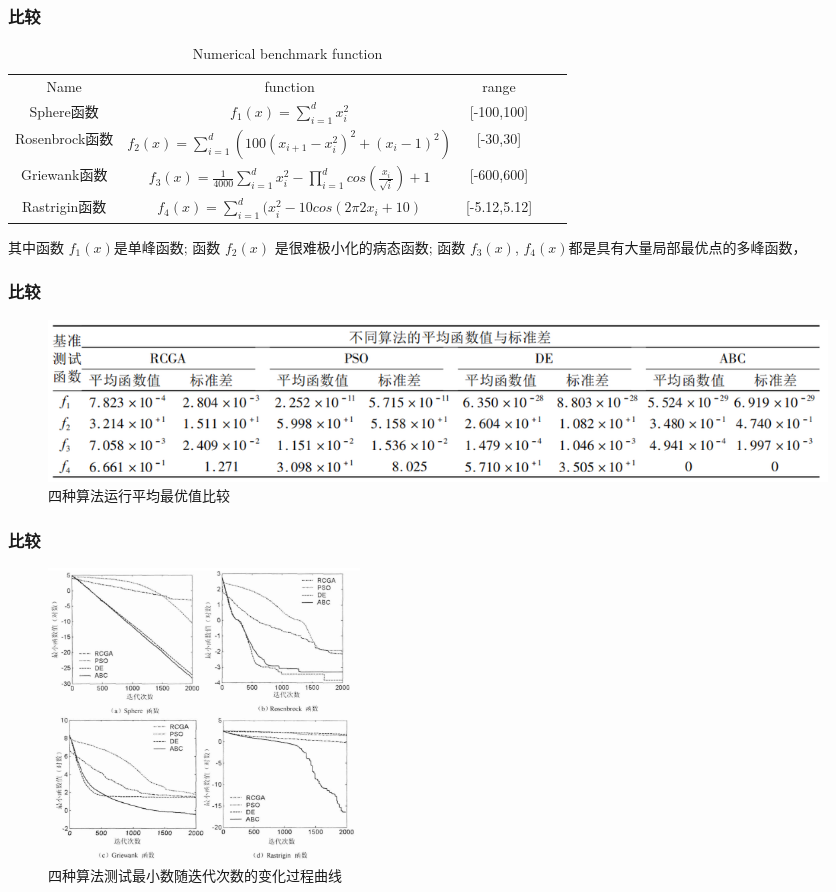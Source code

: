 \begin{frame}
	\frametitle{比较}
	\begin{table}[!htbp]
		\centering
		\caption{Numerical benchmark function}
		\label{my-label}
		\begin{tabular}{|c|c|c|cc}
		\cline{1-2}
		Name     		& function  														& range 		&  &  \\ \cline{1-3}
		Sphere函数 		& $f_{1}(x)= \sum_{i=1}^d x_{i}^2 $     							& [-100,100]	&  &\\ \cline{1-3}
		Rosenbrock函数	& $f_{2}(x)= \sum_{i=1}^d (100(x_{i+1}-x_{i}^2)^2 + (x_{i} - 1)^2 ) $ 	& [-30,30] 		&  &  \\ \cline{1-3}
		Griewank函数    	& $f_{3}(x)= \frac{1}{4000} \sum_{i=1}^d x_{i}^2 -  \prod_{i=1}^d cos(\frac{x_{i}}{\sqrt{i}}) + 1 $   	& [-600,600]	&  &  \\ \cline{1-3}
		Rastrigin函数   	& $f_{4}(x)=\sum_{i=1}^d (x_{i}^2 - 10cos(2   \pi 2 x_{i} + 10)$     	& [-5.12,5.12] 	&  &  \\ \cline{1-3}
		\end{tabular}
	\end{table}

	其中函数 $ f_{1}(x) $是单峰函数; 函数 $ f_{2}(x) $ 是很难极小化的病态函数; 函数 $ f_{3}(x) $, $ f_{4}(x) $都是具有大量局部最优点的多峰函数，

\end{frame}

\begin{frame}
	\frametitle{比较}

	\begin{figure}[htbp]
			\centering
			\includegraphics[width=1.0\textwidth]{pic/bee10.png}
			\caption{四种算法运行平均最优值比较}
			\label{fig:pt3}
	\end{figure}

\end{frame}

\begin{frame}
	\frametitle{比较}

		\begin{figure}[htbp]
			\centering
			\includegraphics[width=0.4\textwidth]{pic/bee11.png}
			\caption{四种算法测试最小数随迭代次数的变化过程曲线}
			\label{fig:pt4}
		\end{figure}


\end{frame}

